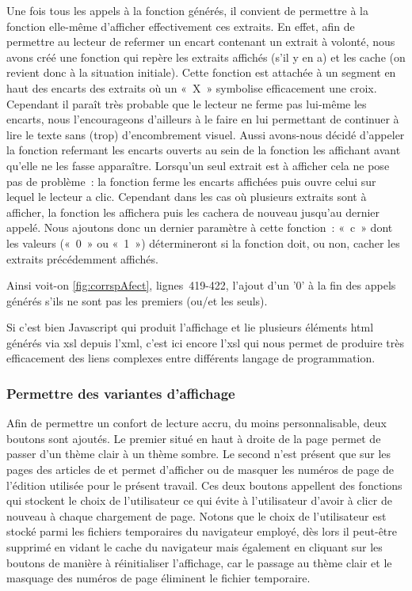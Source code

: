 Une fois tous les appels à la fonction générés, il convient de permettre à la fonction elle-même d'afficher effectivement ces extraits. En effet, afin de permettre au lecteur de refermer un encart contenant un extrait à volonté, nous avons créé une fonction qui repère les extraits affichés (s'il y en a) et les cache (on revient donc à la situation initiale). Cette fonction est attachée à un segment en haut des encarts des extraits où un «~X~» symbolise efficacement une croix.
Cependant il paraît très probable que le lecteur ne ferme pas lui-même les encarts, nous l'encourageons d'ailleurs à le faire en lui permettant de continuer à lire le texte sans (trop) d'encombrement visuel. Aussi avons-nous décidé d'appeler la fonction refermant les encarts ouverts au sein de la fonction les affichant avant qu'elle ne les fasse apparaître.
Lorsqu'un seul extrait est à afficher cela ne pose pas de problème~: la fonction ferme les encarts affichées puis ouvre celui sur lequel le lecteur a clic. Cependant dans les cas où plusieurs extraits sont à afficher, la fonction les affichera puis les cachera de nouveau jusqu'au dernier appelé. Nous ajoutons donc un dernier paramètre à cette fonction~: «~c~» dont les valeurs («~0~» ou «~1~») détermineront si la fonction doit, ou non, cacher les extraits précédemment affichés. 

Ainsi voit-on \ref{fig:corrspAfect}, lignes~419-422, l'ajout d'un '0' à la fin des appels générés s'ils ne sont pas les premiers (ou/et les seuls).


Si c'est bien Javascript qui produit l'affichage et lie plusieurs éléments html générés via xsl depuis l'xml, c'est ici encore l'xsl qui nous permet de produire très efficacement des liens complexes entre différents langage de programmation.

\subsubsection{Permettre des variantes d'affichage}

Afin de permettre un confort de lecture accru, du moins personnalisable, deux boutons sont ajoutés. Le premier situé en haut à droite de la page permet de passer d'un thème clair à un thème sombre. Le second n'est présent que sur les pages des articles de \punr{} et permet d'afficher ou de masquer les numéros de page de l'édition utilisée pour le présent travail. Ces deux boutons appellent des fonctions qui stockent le choix de l'utilisateur ce qui évite à l'utilisateur d'avoir à clicr de nouveau à chaque chargement de page. Notons que le choix de l'utilisateur est stocké parmi les fichiers temporaires du navigateur employé, dès lors il peut-être supprimé en vidant le cache du navigateur mais également en cliquant sur les boutons de manière à réinitialiser l'affichage, car le passage au thème clair et le masquage des numéros de page éliminent le fichier temporaire.


